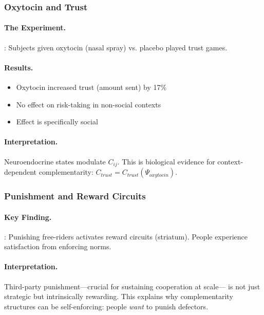\subsubsection{Oxytocin and Trust}

\paragraph{The Experiment.}
\citet{kosfeld2005}: Subjects given oxytocin (nasal spray) vs. placebo
played trust games.

\paragraph{Results.}
\begin{itemize}
  \item Oxytocin increased trust (amount sent) by 17\%
  \item No effect on risk-taking in non-social contexts
  \item Effect is specifically social
\end{itemize}

\paragraph{Interpretation.}
Neuroendocrine states modulate $C_{ij}$.
This is biological evidence for context-dependent complementarity:
$C_{trust} = C_{trust}(\Psi_{oxytocin})$.

\subsubsection{Punishment and Reward Circuits}

\paragraph{Key Finding.}
\citet{dequervain2004}: Punishing free-riders activates reward circuits (striatum).
People experience satisfaction from enforcing norms.

\paragraph{Interpretation.}
Third-party punishment---crucial for sustaining cooperation at scale---
is not just strategic but intrinsically rewarding.
This explains why complementarity structures can be self-enforcing:
people \emph{want} to punish defectors.

